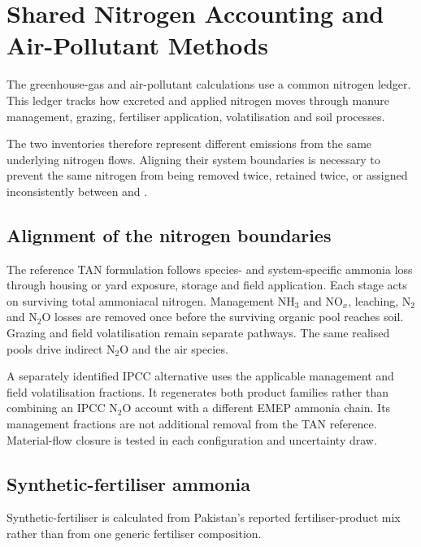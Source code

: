 \section{Shared Nitrogen Accounting and Air-Pollutant Methods}
\label{sec:methods-shared}

The greenhouse-gas and air-pollutant calculations use a common nitrogen ledger. This ledger
tracks how excreted and applied nitrogen moves through manure management, grazing,
fertiliser application, volatilisation and soil processes.

The two inventories therefore represent different emissions from the same underlying
nitrogen flows. Aligning their system boundaries is necessary to prevent the same nitrogen
from being removed twice, retained twice, or assigned inconsistently between \NHthree{} and
\NtwoO{}.

\subsection{Alignment of the nitrogen boundaries}
\label{sec:methods-ledger}

The reference TAN formulation follows species- and system-specific ammonia loss through housing or yard exposure, storage and field application. Each stage acts on surviving total ammoniacal nitrogen. Management NH$_3$ and NO$_x$, leaching, N$_2$ and N$_2$O losses are removed once before the surviving organic pool reaches soil. Grazing and field volatilisation remain separate pathways. The same realised pools drive indirect N$_2$O and the air species.

A separately identified IPCC alternative uses the applicable management and field volatilisation fractions. It regenerates both product families rather than combining an IPCC N$_2$O account with a different EMEP ammonia chain. Its management fractions are not additional removal from the TAN reference. Material-flow closure is tested in each configuration and uncertainty draw.

\subsection{Synthetic-fertiliser ammonia}
\label{sec:methods-air}

Synthetic-fertiliser \NHthree{} is calculated from Pakistan's reported fertiliser-product
mix rather than from one generic fertiliser composition.

